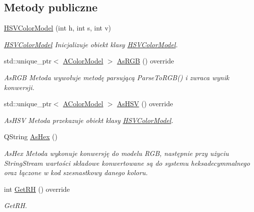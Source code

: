 \subsection*{Metody publiczne}
\begin{DoxyCompactItemize}
\item 
\mbox{\hyperlink{class_h_s_v_color_model_a7dac5687cef8207ebc8279414cfa6706}{H\+S\+V\+Color\+Model}} (int h, int s, int v)
\begin{DoxyCompactList}\small\item\em \mbox{\hyperlink{class_h_s_v_color_model}{H\+S\+V\+Color\+Model}} Inicjalizuje obiekt klasy \mbox{\hyperlink{class_h_s_v_color_model}{H\+S\+V\+Color\+Model}}. \end{DoxyCompactList}\item 
std\+::unique\+\_\+ptr$<$ \mbox{\hyperlink{class_a_color_model}{A\+Color\+Model}} $>$ \mbox{\hyperlink{class_h_s_v_color_model_a576aa9888f81248c99e67da6bb0587d2}{As\+R\+GB}} () override
\begin{DoxyCompactList}\small\item\em As\+R\+GB Metoda wywołuje metodę parsującą Parse\+To\+R\+G\+B() i zwraca wynik konwersji. \end{DoxyCompactList}\item 
std\+::unique\+\_\+ptr$<$ \mbox{\hyperlink{class_a_color_model}{A\+Color\+Model}} $>$ \mbox{\hyperlink{class_h_s_v_color_model_a4f15c9e48f157f7bd83f5a0837f1ac87}{As\+H\+SV}} () override
\begin{DoxyCompactList}\small\item\em As\+H\+SV Metoda przekazuje obiekt klasy \mbox{\hyperlink{class_h_s_v_color_model}{H\+S\+V\+Color\+Model}}. \end{DoxyCompactList}\item 
Q\+String \mbox{\hyperlink{class_h_s_v_color_model_ab67eb5960aa53f4b573c40fd0945a9b9}{As\+Hex}} ()
\begin{DoxyCompactList}\small\item\em As\+Hex Metoda wykonuje konwersję do modelu R\+GB, następnie przy użyciu String\+Stream wartości składowe konwertowane są do systemu heksadecymmalnego oraz łączone w kod szesnastkowy danego koloru. \end{DoxyCompactList}\item 
int \mbox{\hyperlink{class_h_s_v_color_model_aeb9fd06a7806c227ee6a8ad85ee9fbf8}{Get\+RH}} () override
\begin{DoxyCompactList}\small\item\em Get\+RH. \end{DoxyCompactList}\item 

\end{DoxyCompactItemize}

